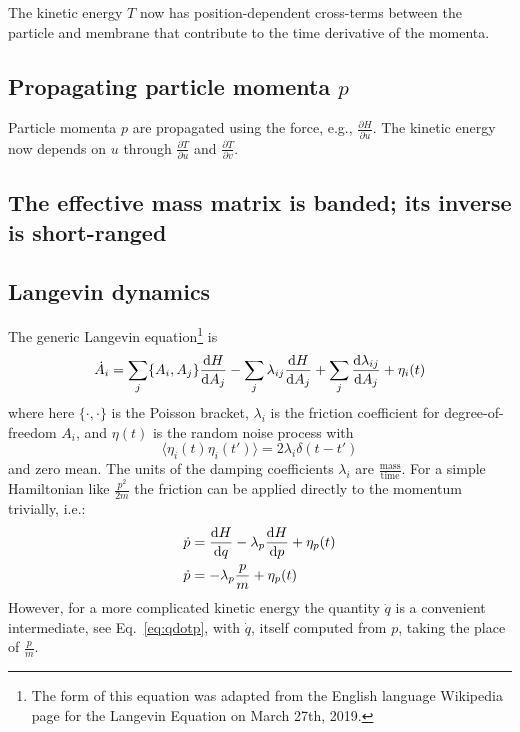 The kinetic energy $T$ now has position-dependent cross-terms between the particle and membrane that contribute to the time derivative of the momenta.

\subsection{Propagating particle momenta $p$ }

Particle momenta $p$ are propagated using the force, e.g., $\frac{\partial{H}}{\partial{u}}$.
The kinetic energy now depends on $u$ through $\frac{\partial T}{\partial u}$ and $\frac{\partial T}{\partial v}$.

\subsection{The effective mass matrix is banded; its inverse is short-ranged }




\subsection{Langevin dynamics}

The generic Langevin equation\footnote{The form of this equation was adapted from the English language Wikipedia page for the Langevin Equation on March 27th, 2019.}
is
\begin{equation}
\dot{A}_i = \sum_j \{ A_i, A_j \} \frac{\textrm{d} H}{\textrm{d} A_j} - \sum_j \lambda_{ij} \frac{\textrm{d} H}{\textrm{d} A_j} + \sum_j \frac{ \textrm{d} \lambda_{ij} }{\textrm{d} A_j} + \eta_i(t)
\end{equation}
where here $\{ \cdot, \cdot \}$ is the Poisson bracket, $\lambda_i$ is the friction coefficient for degree-of-freedom $A_i$, and $\eta(t)$ is the random noise process with
\begin{equation}
\langle \eta_i(t) \eta_i(t') \rangle = 2 \lambda_i \delta(t-t')
\end{equation}
and zero mean.
The units of the damping coefficients $\lambda_i$ are $\frac{\textrm{mass}}{\textrm{time}}$.
For a simple Hamiltonian like $\frac{p^2}{2 m}$ the friction can be applied directly to the momentum trivially, i.e.:
\begin{align}
\dot{p} &= \frac{\textrm{d} H}{\textrm{d} q} - \lambda_p \frac{\textrm{d} H}{\textrm{d} p} + \eta_p(t) \\
\dot{p} &= - \lambda_p \frac{p}{m} + \eta_p(t) 
\end{align}
However, for a more complicated kinetic energy the quantity $\dot{q}$ is a convenient intermediate, see Eq.~\ref{eq:qdotp}, with $\dot{q}$, itself computed from $p$, taking the place of $\frac{p}{m}$. 


%
%
%




